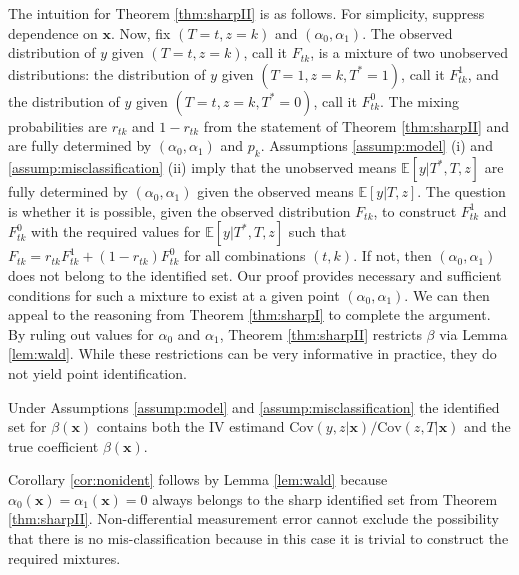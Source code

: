 
The intuition for Theorem \ref{thm:sharpII} is as follows.
For simplicity, suppress dependence on $\mathbf{x}$.
Now, fix $(T=t, z=k)$ and $(\alpha_0, \alpha_1)$.
The observed distribution of $y$ given $(T=t,z=k)$, call it $F_{tk}$, is a mixture of two unobserved distributions: the distribution of $y$ given $(T=1,z=k,T^*=1)$, call it $F^1_{tk}$, and the distribution of $y$ given $(T=t,z=k,T^*=0)$, call it $F^{0}_{tk}$.
The mixing probabilities are $r_{tk}$ and $1-r_{tk}$ from the statement of Theorem \ref{thm:sharpII} and are fully determined by $(\alpha_0, \alpha_1)$ and $p_k$.
Assumptions \ref{assump:model} (i) and \ref{assump:misclassification} (ii) imply that the unobserved means $\mathbb{E}[y|T^*,T,z]$  are fully determined by $(\alpha_0, \alpha_1)$ given the observed means $\mathbb{E}[y|T,z]$.
The question is whether it is possible, given the observed distribution $F_{tk}$, to construct $F^1_{tk}$ and $F^{0}_{tk}$ with the required values for $\mathbb{E}[y|T^*,T,z]$ such that $F_{tk} = r_{tk} F^{1}_{tk} + (1 - r_{tk}) F^{0}_{tk}$ for all combinations $(t,k)$. 
If not, then $(\alpha_0, \alpha_1)$ does not belong to the identified set.
Our proof provides necessary and sufficient conditions for such a mixture to exist at a given point $(\alpha_0, \alpha_1)$.
We can then appeal to the reasoning from Theorem \ref{thm:sharpI} to complete the argument.
By ruling out values for $\alpha_0$ and $\alpha_1$, Theorem \ref{thm:sharpII} restricts $\beta$ via Lemma \ref{lem:wald}. 
While these restrictions can be very informative in practice, they do not yield point identification.

\begin{cor}
  Under Assumptions \ref{assump:model} and \ref{assump:misclassification} the identified set for $\beta(\mathbf{x})$ contains both the IV estimand $\mbox{Cov}(y,z|\mathbf{x})/\mbox{Cov}(z,T|\mathbf{x})$ and the true coefficient $\beta(\mathbf{x})$.
  \label{cor:nonident}
\end{cor}

Corollary \ref{cor:nonident} follows by Lemma \ref{lem:wald} because $\alpha_0(\mathbf{x})=\alpha_1(\mathbf{x})=0$ always belongs to the sharp identified set from Theorem \ref{thm:sharpII}.
Non-differential measurement error cannot exclude the possibility that there is no mis-classification because in this case it is trivial to construct the required mixtures.

